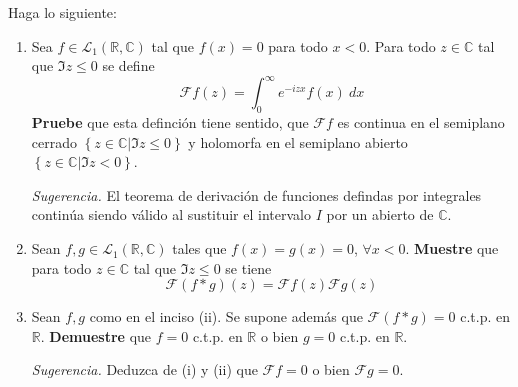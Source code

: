 \documentclass[12pt]{report}
\theoremstyle{largebreak}
\renewcommand{\leq}{\ensuremath{\leqslant}}
\newcommand{\fou}[1]{\ensuremath{\mathcal{F}#1}}
\begin{document}
    \begin{excer}
        Haga lo siguiente:
        \begin{enumerate}
            \item Sea $f\in\mathcal{L}_1(\mathbb{R},\mathbb{C})$ tal que $f(x)=0$ para todo $x<0$. Para todo $z\in\mathbb{C}$ tal que $\Im z\leq 0$ se define
            \begin{equation*}
                \fou{f}(z)=\int_0^{\infty}e^{ -izx}f(x)\:dx
            \end{equation*}
            \textbf{Pruebe} que esta definción tiene sentido, que $\fou{f}$ es continua en el semiplano cerrado $\left\{z\in\mathbb{C}\Big|\Im z\leq0 \right\}$ y holomorfa en el semiplano abierto $\left\{z\in\mathbb{C}\Big|\Im z<0 \right\}$.

            \textit{Sugerencia.} El teorema de derivación de funciones defindas por integrales continúa siendo válido al sustituir el intervalo $I$ por un abierto de $\mathbb{C}$.

            \item Sean $f,g\in\mathcal{L}_1(\mathbb{R},\mathbb{C})$ tales que $f(x)=g(x)=0$, $\forall x<0$. \textbf{Muestre} que para todo $z\in\mathbb{C}$ tal que $\Im z\leq 0$ se tiene
            \begin{equation*}
                \fou{(f*g)}(z)=\fou{f}(z)\fou{g}(z)
            \end{equation*}
            \item Sean $f,g$ como en el inciso (ii). Se supone además que $\fou{(f*g)}=0$ c.t.p. en $\mathbb{R}$. \textbf{Demuestre} que $f=0$ c.t.p. en $\mathbb{R}$ o bien $g=0$ c.t.p. en $\mathbb{R}$.
            
            \textit{Sugerencia.} Deduzca de (i) y (ii) que $\fou{f}=0$ o bien $\fou{g}=0$.
        \end{enumerate}
    \end{excer}
\end{document}
